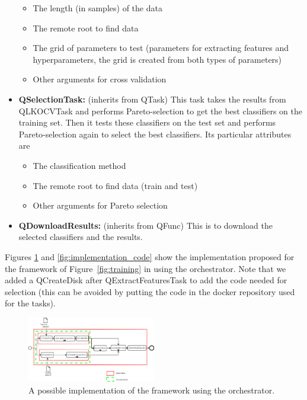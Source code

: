 \documentclass[10pt, conference, compsocconf]{IEEEtran}
\begin{document}
\begin{itemize}
\begin{itemize}
  \item The length (in samples) of the data
  \item The remote root to find data
  \item The grid of parameters to test (parameters for extracting features and hyperparameters, the grid is created from both types of parameters)
  \item Other arguments for cross validation
  \end{itemize}
\item \textbf{QSelectionTask:} (inherits from QTask) This task takes the results from QLKOCVTask and performs Pareto-selection to get the best classifiers on the training set. Then it tests these classifiers on the test set and performs Pareto-selection again to select the best classifiers.
  Its particular attributes are
  \begin{itemize}
  \item The classification method
  \item The remote root to find data (train and test)
  \item Other arguments for Pareto selection
  \end{itemize}
\item \textbf{QDownloadResults:} (inherits from QFunc) This is to download the selected classifiers and the results.
\end{itemize}
Figures \ref{fig:implementation_diagram} and \ref{fig:implementation_code} show the implementation proposed for the framework of Figure~\ref{fig:training} in using the orchestrator. Note that we added a QCreateDisk after QExtractFeaturesTask to add the code needed for selection (this can be avoided by putting the code in the docker repository used for the tasks).
\begin{figure}[H]
\centering
\includegraphics[width=0.5\textwidth]{Figures/implementation.png}
\caption{A possible implementation of the framework using the orchestrator.}
\label{fig:implementation_diagram}
\end{figure}
\begin{mdframed}[backgroundcolor=LightGray,topline=false, bottomline=false,leftline=false, rightline=false]
\inputminted[baselinestretch=1, fontsize=\scriptsize]{python}{selection.py}
\end{mdframed}
\label{fig:implementation_code}
\end{document}
